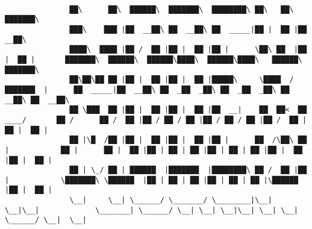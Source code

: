 \documentclass[varwidth=\maxdimen,margin=0.5cm,multi={verbatim}]{standalone}
\begin{document}
\begin{verbatim}

               ██\      ██\  ██████\  ███████\  ████████\ ██\   ██\ ███████\                                                                            
               ███\    ███ |██  __██\ ██  __██\ ██  _____|██ |  ██ |██  __██\                                                                           
               ████\  ████ |██ /  ██ |██ |  ██ |██ |      \██\ ██  |██ |  ██ |       ███████\  ██████\  ██████\████\  ██████\████\   ██████\  ███████\  
               ██\██\██ ██ |██ |  ██ |██ |  ██ |█████\     \████  / ███████  |      ██  _____|██  __██\ ██  _██  _██\ ██  _██  _██\ ██  __██\ ██  __██\ 
               ██ \███  ██ |██ |  ██ |██ |  ██ |██  __|    ██  ██<  ██  ____/       ██ /      ██ /  ██ |██ / ██ / ██ |██ / ██ / ██ |██ /  ██ |██ |  ██ |
               ██ |\█  /██ |██ |  ██ |██ |  ██ |██ |      ██  /\██\ ██ |            ██ |      ██ |  ██ |██ | ██ | ██ |██ | ██ | ██ |██ |  ██ |██ |  ██ |
               ██ | \_/ ██ | ██████  |███████  |████████\ ██ /  ██ |██ |            \███████\ \██████  |██ | ██ | ██ |██ | ██ | ██ |\██████  |██ |  ██ |
               \__|     \__| \______/ \_______/ \________|\__|  \__|\__|             \_______| \______/ \__| \__| \__|\__| \__| \__| \______/ \__|  \__|





\end{verbatim}
\end{document}
